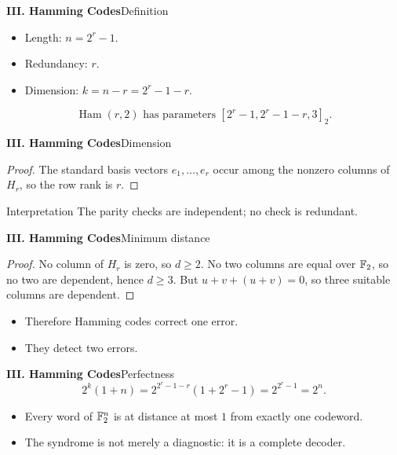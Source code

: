 \begin{frame}{\textbf{III. Hamming Codes}}{Definition}
\small
{}
\begin{itemize}
  \item Length: $n=2^r-1$.
  \item Redundancy: $r$.
  \item Dimension: $k=n-r=2^r-1-r$.
\end{itemize}
\[
  \operatorname{Ham}(r,2)\text{ has parameters }[2^r-1,2^r-1-r,3]_2.
\]
\end{frame}

\begin{frame}{\textbf{III. Hamming Codes}}{Dimension}
\small
{}
\begin{proof}
The standard basis vectors $e_1,\ldots,e_r$ occur among the nonzero columns of $H_r$, so the row rank is $r$.
\end{proof}
\begin{block}{Interpretation}
The parity checks are independent; no check is redundant.
\end{block}
\end{frame}

\begin{frame}{\textbf{III. Hamming Codes}}{Minimum distance}
\small
{}
\begin{proof}
No column of $H_r$ is zero, so $d\ge2$. No two columns are equal over $\mathbb{F}_2$, so no two are dependent, hence $d\ge3$. But $u+v+(u+v)=0$, so three suitable columns are dependent.
\end{proof}
\begin{itemize}
  \item Therefore Hamming codes correct one error.
  \item They detect two errors.
\end{itemize}
\end{frame}

\begin{frame}{\textbf{III. Hamming Codes}}{Perfectness}
\small
{}
\[
  2^k(1+n)=2^{2^r-1-r}(1+2^r-1)=2^{2^r-1}=2^n.
\]
\begin{itemize}
  \item Every word of $\mathbb{F}_2^n$ is at distance at most $1$ from exactly one codeword.
  \item The syndrome is not merely a diagnostic: it is a complete decoder.
\end{itemize}
\end{frame}

